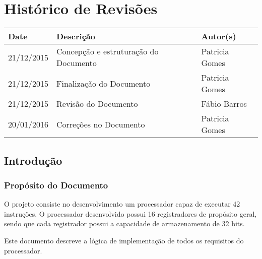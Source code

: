 \documentclass{report}
\begin{document}

\capa
\newpage
\newpage

\chapter*{Histórico de Revisões}
  \vspace*{1cm}
  \begin{table}[ht]
    \centering
    \begin{tabular}[pos]{|m{2cm} | m{6cm} | m{3cm}|} 
      \hline
      \cellcolor[gray]{0.9}\textbf{Date} & \cellcolor[gray]{0.9}\textbf{Descrição} & \cellcolor[gray]{0.9}\textbf{Autor(s)}\\
      \hline
      21/12/2015 & Concepção e estruturação do Documento & Patricia Gomes \\ \hline      
      21/12/2015 & Finalização do Documento & Patricia Gomes \\ \hline      
      21/12/2015 & Revisão do Documento & Fábio Barros \\ \hline 
      20/01/2016 & Correções no Documento & Patricia Gomes \\ \hline
    \end{tabular}
  \end{table}

\newpage

\tableofcontents
\newpage

\section{Introdução}
 \subsection{Propósito do Documento}
  O projeto consiste no desenvolvimento um processador capaz de executar 42 instruções. O processador desenvolvido possui 16 registradores de propósito geral, sendo que cada registrador possui a capacidade de armazenamento de 32 bits.
  
  Este documento descreve a lógica de implementação de todos os requisitos do processador.
\end{document}
